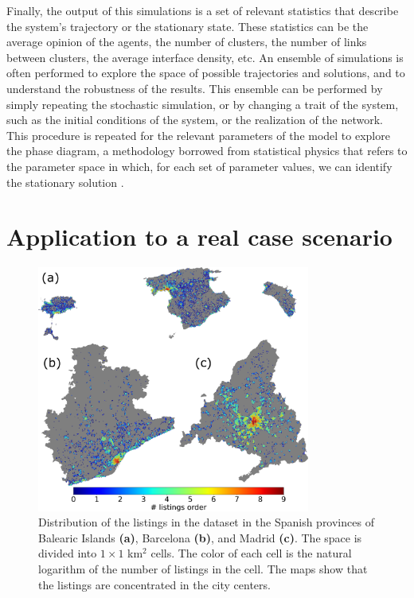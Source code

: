 Finally, the output of this simulations is a set of relevant statistics that describe the system's trajectory or the stationary state. These statistics can be the average opinion of the agents, the number of clusters, the number of links between clusters, the average interface density, etc. An ensemble of simulations is often performed to explore the space of possible trajectories and solutions, and to understand the robustness of the results. This ensemble can be performed by simply repeating the stochastic simulation, or by changing a trait of the system, such as the initial conditions of the system, or the realization of the network. This procedure is repeated for the relevant parameters of the model to explore the phase diagram, a methodology borrowed from statistical physics that refers to the parameter space in which, for each set of parameter values, we can identify the stationary solution \cite{goldenfeld-1992}.

\section{\label{sec:Datasets} Application to a real case scenario}

\begin{figure}[ht]
    \centering
    \includegraphics[width=0.80\textwidth]{Figs/Introduction/adds_size_map.pdf}
    \caption[Listings distribution in space]{Distribution of the listings in the dataset in the Spanish provinces of Balearic Islands \textbf{(a)}, Barcelona \textbf{(b)}, and Madrid \textbf{(c)}. The space is divided into $1 \times 1$ km$^2$ cells. The color of each cell is the natural logarithm of the number of listings in the cell. The maps show that the listings are concentrated in the city centers. }
    \label{fig:maps_adds}
\end{figure}

